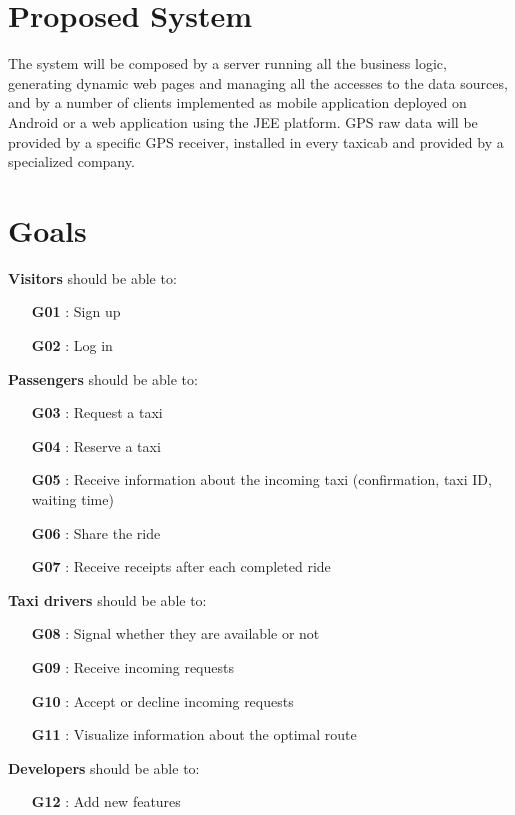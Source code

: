 \section{Proposed System}
The system will be composed by a server running all the business logic, generating dynamic web pages and managing all the accesses to the data sources, and by a number of clients implemented as mobile application deployed on Android or a web application using the JEE platform. GPS raw data will be provided by a specific GPS receiver, installed in every taxicab and provided by a specialized company.

\section{Goals}
\noindent \textbf{Visitors} should be able to:
\begin{itemize}
	\item [\textbf{G01}] : Sign up 
	\item [\textbf{G02}] : Log in\\
\end{itemize}

\noindent \textbf{Passengers} should be able to:
\begin{itemize}
	\item [\textbf{G03}] : Request a taxi
	\item [\textbf{G04}] : Reserve a taxi
	\item [\textbf{G05}] : Receive information about the incoming taxi (confirmation, taxi ID, waiting time)
	\item [\textbf{G06}] : Share the ride
	\item [\textbf{G07}] : Receive receipts after each completed ride\\
\end{itemize}

\noindent \textbf{Taxi drivers} should be able to:
\begin{itemize}
	\item [\textbf{G08}] : Signal whether they are available or not
	\item [\textbf{G09}] : Receive incoming requests
	\item [\textbf{G10}] : Accept or decline incoming requests
	\item [\textbf{G11}] : Visualize information about the optimal route\\
\end{itemize}

\noindent \textbf{Developers} should be able to:
\begin{itemize}
	\item [\textbf{G12}] : Add new features
\end{itemize}

